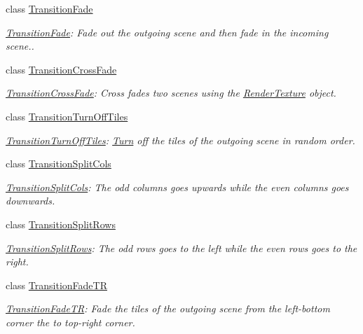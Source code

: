 \begin{DoxyCompactItemize}
class \hyperlink{classTransitionFade}{Transition\+Fade}
\begin{DoxyCompactList}\small\item\em \hyperlink{classTransitionFade}{Transition\+Fade}\+: Fade out the outgoing scene and then fade in the incoming scene.\textquotesingle{}\textquotesingle{}\textquotesingle{}. \end{DoxyCompactList}\item 
class \hyperlink{classTransitionCrossFade}{Transition\+Cross\+Fade}
\begin{DoxyCompactList}\small\item\em \hyperlink{classTransitionCrossFade}{Transition\+Cross\+Fade}\+: Cross fades two scenes using the \hyperlink{classRenderTexture}{Render\+Texture} object. \end{DoxyCompactList}\item 
class \hyperlink{classTransitionTurnOffTiles}{Transition\+Turn\+Off\+Tiles}
\begin{DoxyCompactList}\small\item\em \hyperlink{classTransitionTurnOffTiles}{Transition\+Turn\+Off\+Tiles}\+: \hyperlink{classTurn}{Turn} off the tiles of the outgoing scene in random order. \end{DoxyCompactList}\item 
class \hyperlink{classTransitionSplitCols}{Transition\+Split\+Cols}
\begin{DoxyCompactList}\small\item\em \hyperlink{classTransitionSplitCols}{Transition\+Split\+Cols}\+: The odd columns goes upwards while the even columns goes downwards. \end{DoxyCompactList}\item 
class \hyperlink{classTransitionSplitRows}{Transition\+Split\+Rows}
\begin{DoxyCompactList}\small\item\em \hyperlink{classTransitionSplitRows}{Transition\+Split\+Rows}\+: The odd rows goes to the left while the even rows goes to the right. \end{DoxyCompactList}\item 
class \hyperlink{classTransitionFadeTR}{Transition\+Fade\+TR}
\begin{DoxyCompactList}\small\item\em \hyperlink{classTransitionFadeTR}{Transition\+Fade\+TR}\+: Fade the tiles of the outgoing scene from the left-\/bottom corner the to top-\/right corner. \end{DoxyCompactList}\item 

\end{DoxyCompactItemize}
